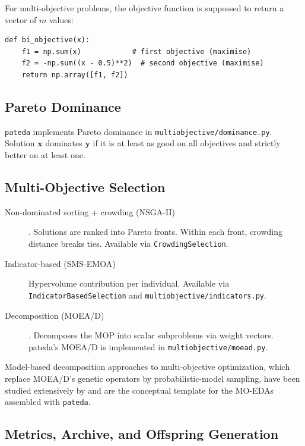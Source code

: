 \documentclass[a4paper,11pt]{article}
\begin{document}
For multi-objective problems, the objective function is suppossed to return a vector of $m$ values: 

\begin{lstlisting}
def bi_objective(x):
    f1 = np.sum(x)            # first objective (maximise)
    f2 = -np.sum((x - 0.5)**2)  # second objective (maximise)
    return np.array([f1, f2])
\end{lstlisting}

\subsection{Pareto Dominance}

\texttt{pateda} implements Pareto dominance in \texttt{multiobjective/dominance.py}. Solution $\mathbf{x}$ dominates $\mathbf{y}$ if it is at least as good on all objectives and strictly better on at least one.

\subsection{Multi-Objective Selection}

\begin{description}
  \item[Non-dominated sorting + crowding (NSGA-II)]
    \citep{Deb_et_al:2002a}.
    Solutions are ranked into Pareto fronts.  Within each front, crowding  distance breaks ties.  Available via \texttt{CrowdingSelection}.

  \item[Indicator-based (SMS-EMOA)]
    Hypervolume contribution per individual.  Available via
    \texttt{IndicatorBasedSelection} and \texttt{multiobjective/indicators.py}.

  \item[Decomposition (MOEA/D)] \citep{Zhang_and_Li:2007}.
    Decomposes the MOP into scalar subproblems via weight vectors.
    pateda's MOEA/D is implemented in \texttt{multiobjective/moead.py}.
\end{description}

Model-based decomposition approaches to multi-objective optimization, which
replace MOEA/D's genetic operators by probabilistic-model sampling, have been
studied extensively by \citet{Zangari_et_al:2017,Zangari_et_al:2017b} and are the
conceptual template for the MO-EDAs assembled with \texttt{pateda}.

\subsection{Metrics, Archive, and Offspring Generation}
\label{sec:mo_details}
\end{document}
